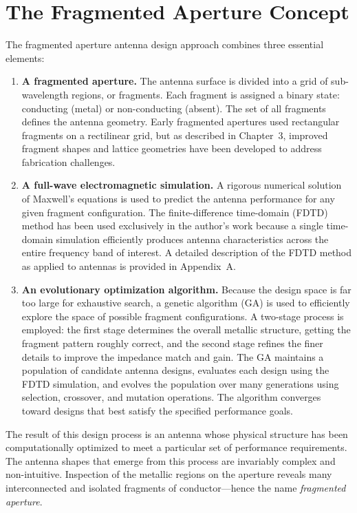\section{The Fragmented Aperture Concept}

The fragmented aperture antenna design approach combines three essential elements:

\begin{enumerate}

\item \textbf{A fragmented aperture.}  The antenna surface is divided into a grid of sub-wavelength regions, or fragments.  Each fragment is assigned a binary state: conducting (metal) or non-conducting (absent).  The set of all fragments defines the antenna geometry.  Early fragmented apertures used rectangular fragments on a rectilinear grid, but as described in Chapter~3, improved fragment shapes and lattice geometries have been developed to address fabrication challenges.

\item \textbf{A full-wave electromagnetic simulation.}  A rigorous numerical solution of Maxwell's equations is used to predict the antenna performance for any given fragment configuration.  The finite-difference time-domain (FDTD) method has been used exclusively in the author's work because a single time-domain simulation efficiently produces antenna characteristics across the entire frequency band of interest.  A detailed description of the FDTD method as applied to antennas is provided in Appendix~A.

\item \textbf{An evolutionary optimization algorithm.}  Because the design space is far too large for exhaustive search, a genetic algorithm (GA) is used to efficiently explore the space of possible fragment configurations.  A two-stage process is employed: the first stage determines the overall metallic structure, getting the fragment pattern roughly correct, and the second stage refines the finer details to improve the impedance match and gain.  The GA maintains a population of candidate antenna designs, evaluates each design using the FDTD simulation, and evolves the population over many generations using selection, crossover, and mutation operations.  The algorithm converges toward designs that best satisfy the specified performance goals.

\end{enumerate}

The result of this design process is an antenna whose physical structure has been computationally optimized to meet a particular set of performance requirements.  The antenna shapes that emerge from this process are invariably complex and non-intuitive.  Inspection of the metallic regions on the aperture reveals many interconnected and isolated fragments of conductor---hence the name \emph{fragmented aperture}.

